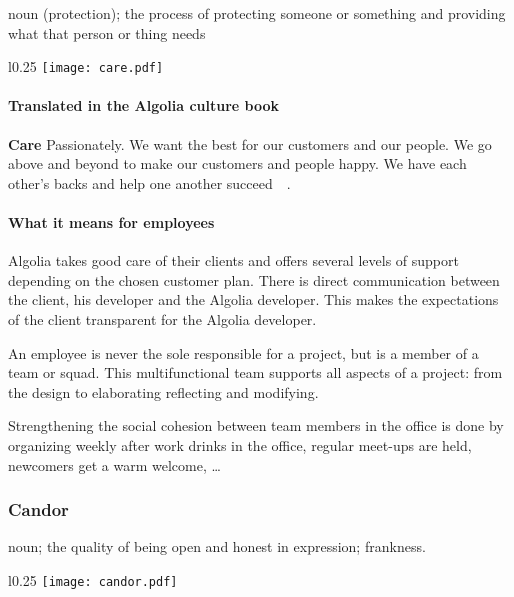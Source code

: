 \begin{definition}
noun (protection); the process of protecting someone or something and providing what that person or thing needs
\end{definition}

\begin{wrapfigure}{l}{0.25\textwidth}
  \centering
  \texttt{[image: care.pdf]}
\end{wrapfigure}

\paragraph{Translated in the Algolia culture book}

\textbf{Care} Passionately. We want the best for our customers and our people. We go above and beyond to make our customers and people happy. We have each other's backs and help one another succeed~\cite{algolia-careers}~.

\paragraph{What it means for employees} 

Algolia takes good care of their clients and offers several levels of support depending on the chosen customer plan. There is direct communication between the client, his developer and the Algolia developer. This makes the expectations of the client transparent for the Algolia developer.

An employee is never the sole responsible for a project, but is a member of a team or squad. This multifunctional team supports all aspects of a project: from the design to elaborating reflecting and modifying.

Strengthening the social cohesion between team members in the office is done by organizing weekly after work drinks in the office, regular meet-ups are held, newcomers get a warm welcome, \dots

\subsubsection{Candor}
\label{ssub:candor}

\begin{definition}
noun; the quality of being open and honest in expression; frankness.
\end{definition}

\begin{wrapfigure}{l}{0.25\textwidth}
  \centering
  \texttt{[image: candor.pdf]}
\end{wrapfigure}

